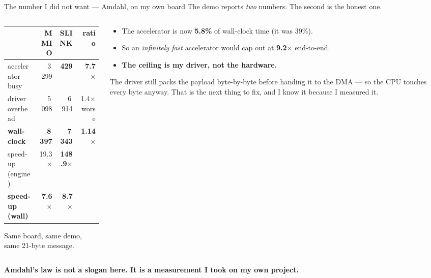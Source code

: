 \documentclass[aspectratio=169,11pt]{beamer}
\begin{document}
\begin{frame}{The number I did not want --- Amdahl, on my own board}
{\small The demo reports \emph{two} numbers. The second is the honest one.}
\vspace{0.5mm}
\begin{columns}[T]
\begin{column}{0.52\textwidth}
\centering
{\footnotesize\setlength{\tabcolsep}{4pt}\renewcommand{\arraystretch}{1.12}
\begin{tabular}{lrrr}
\toprule
& \textbf{MMIO} & \textbf{SLINK} & \textbf{ratio}\\
\midrule
accelerator busy & 3\,299 & \textbf{429}   & \textbf{7.7$\times$}\\
driver overhead  & 5\,098 & 6\,914 & 1.4$\times$ \alert{worse}\\
\midrule
\textbf{wall-clock} & \textbf{8\,397} & \textbf{7\,343} & \textbf{1.14$\times$}\\
\midrule
speed-up (engine) & 19.3$\times$ & \textbf{148.9$\times$} & \\
\rowcolor{hwfill}
\textbf{speed-up (wall)} & \textbf{7.6$\times$} & \textbf{8.7$\times$} & \\
\bottomrule
\end{tabular}}
\vspace{1mm}

{\footnotesize Same board, same demo, same 21-byte message.}
\end{column}
\begin{column}{0.48\textwidth}
\vspace{-1mm}
\begin{center}
\end{center}
\vspace{1mm}
\begin{itemize}\footnotesize
\item The accelerator is now \textbf{5.8\%} of wall-clock time (it was 39\%).
\item So an \emph{infinitely fast} accelerator would cap out at
      \textbf{9.2$\times$} end-to-end.
\item \textbf{The ceiling is my driver, not the hardware.}
\end{itemize}
\vspace{1mm}
{\footnotesize The driver still packs the payload byte-by-byte before handing it to
the DMA --- so the CPU touches every byte anyway. That is the next thing to fix,
and I know it because I measured it.}
\end{column}
\end{columns}
\vspace{1mm}
{\small\color{docblue}\textbf{Amdahl's law is not a slogan here. It is a measurement I took on my own project.}}
\end{frame}
\end{document}
